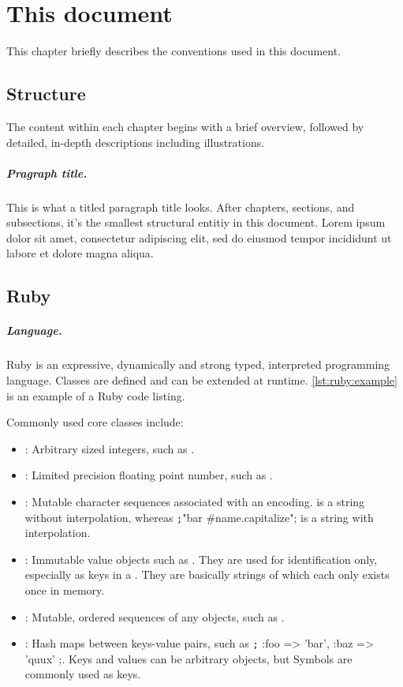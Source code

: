 \chapter{This document}
This chapter briefly describes the conventions used in this document.

\section{Structure}
The content within each chapter begins with a brief overview,
followed by detailed, in-depth descriptions including illustrations.

\paragraph*{Pragraph title.} This is what a titled paragraph title looks. After
chapters, sections, and subsections, it's the smallest structural entitiy in
this document.
Lorem ipsum dolor sit amet, consectetur adipiscing elit, sed do
eiusmod tempor incididunt ut labore et dolore magna aliqua.

\section{Ruby}
\paragraph*{Language.} Ruby is an expressive, dynamically and strong typed, interpreted
programming language. Classes are defined and can be extended at runtime.
\autoref{lst:ruby:example} is an example of a Ruby code listing.

Commonly used core classes include:
\begin{itemize}
	\item {}:
		Arbitrary sized integers, such as .
	\item {}:
		Limited precision floating point number, such as .
	\item {}:
		Mutable character sequences associated with an encoding.
		 is a string without interpolation, whereas
		\texttt;"bar #{name.capitalize}"; is a string with interpolation.
	\item {}:
		Immutable value objects such as . They are used for identification only,
		especially as keys in a . They are basically strings of
		which each only exists once in memory.
	\item {}:
		Mutable, ordered sequences of any objects, such as .
	\item {}:
		Hash maps between keys-value pairs, such as
		\texttt;{ :foo => 'bar', :baz => 'quux' };.
		Keys and values can be arbitrary objects, but Symbols are
		commonly used as keys.
\end{itemize}

